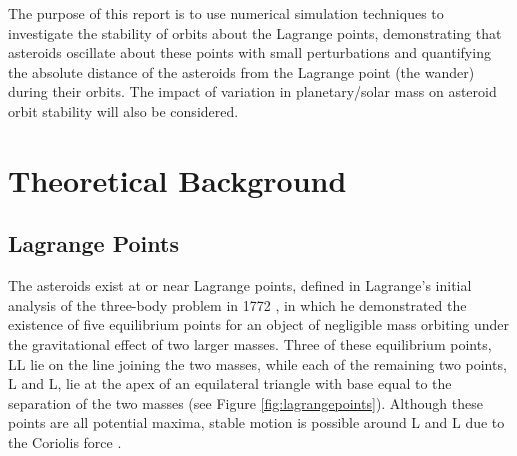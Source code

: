 \documentclass[11pt, a4paper,twocolumn]{article} %
\begin{document}
The purpose of this report is to use numerical simulation techniques to investigate the stability of orbits about the Lagrange points, demonstrating that asteroids oscillate about these points with small perturbations and quantifying the absolute distance of the asteroids from the Lagrange point (the wander) during their orbits. The impact of variation in planetary/solar mass on asteroid orbit stability will also be considered. 


\section{Theoretical Background}

\subsection{Lagrange Points} \label{lagrange}
The asteroids exist at or near Lagrange points, defined in Lagrange's initial analysis of the three-body problem in 1772 \cite{Lagrange1772}, in which he demonstrated the existence of five equilibrium points for an object of negligible mass orbiting under the gravitational effect of two larger masses. Three of these equilibrium points, L\textendash L lie on the line joining the two masses, while each of the remaining two points, L and L, lie at the apex of an equilateral triangle with base equal to the separation of the two masses (see Figure \ref{fig:lagrangepoints}). Although these points are all potential maxima, stable motion is possible around L and L due to the Coriolis force \cite{Lissauer2014}.
\end{document}
